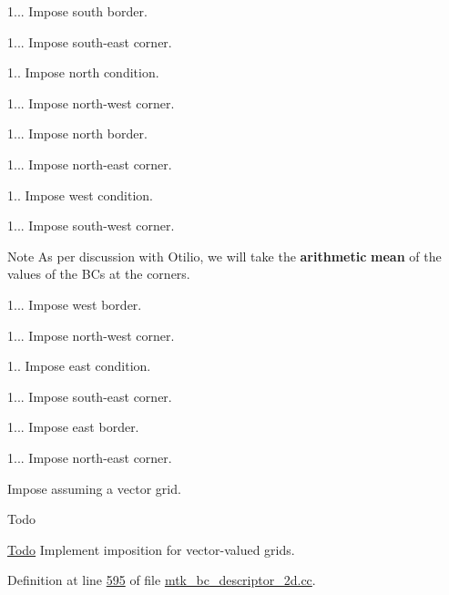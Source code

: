 1... Impose south border.

1... Impose south-\/east corner.

1.. Impose north condition.

1... Impose north-\/west corner.

1... Impose north border.

1... Impose north-\/east corner.

1.. Impose west condition.

1... Impose south-\/west corner. \begin{DoxyNote}{Note}
As per discussion with Otilio, we will take the {\bfseries arithmetic} {\bfseries mean} of the values of the B\+Cs at the corners.
\end{DoxyNote}
1... Impose west border.

1... Impose north-\/west corner.

1.. Impose east condition.

1... Impose south-\/east corner.

1... Impose east border.

1... Impose north-\/east corner.


\begin{DoxyEnumerate}
\item Impose assuming a vector grid.
\end{DoxyEnumerate}

\begin{DoxyRefDesc}{Todo}
\item[\hyperlink{todo__todo000014}{Todo}]Implement imposition for vector-\/valued grids. \end{DoxyRefDesc}


Definition at line \hyperlink{mtk__bc__descriptor__2d_8cc_source_l00595}{595} of file \hyperlink{mtk__bc__descriptor__2d_8cc_source}{mtk\+\_\+bc\+\_\+descriptor\+\_\+2d.\+cc}.



